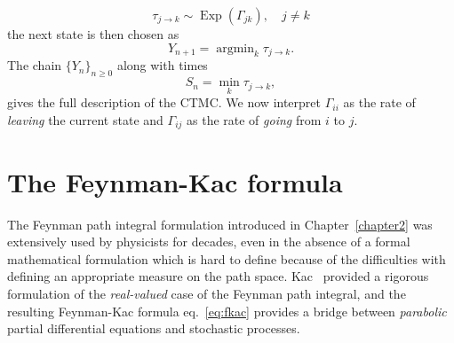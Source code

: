 \begin{equation}
	\tau_{j \rightarrow k} \sim \operatorname{Exp}(\Gamma_{jk}), \quad j \neq k
\end{equation}
the next state is then chosen as
\begin{equation}
	Y_{n+1} = \operatorname{argmin}_{k} \tau_{j \rightarrow k}.
\end{equation}
The chain $\{Y_n\}_{n\geq0}$ along with times 
\begin{equation}
	S_{n} = \min _{k} \tau_{j \rightarrow k},
\end{equation}
gives the full description of the CTMC. We now interpret $\Gamma_{ii}$ as the rate of \emph{leaving} the current state and $\Gamma_{i j}$ as the rate of \emph{going} from $i$ to $j$.

\section{The Feynman-Kac formula}
\label{subsec:fk-fk}
The Feynman path integral formulation introduced in Chapter~\ref{chapter2} was extensively used by physicists for decades, even in the absence of a formal mathematical formulation which is hard to define because of the difficulties with defining an appropriate measure on the path space. Kac~\cite{kac1949distributions} provided a rigorous formulation of the \textit{real-valued} case of the Feynman path integral, and the resulting {Feynman-Kac formula} eq.~\eqref{eq:fkac} provides a bridge between \emph{parabolic} partial differential equations and stochastic processes. 

